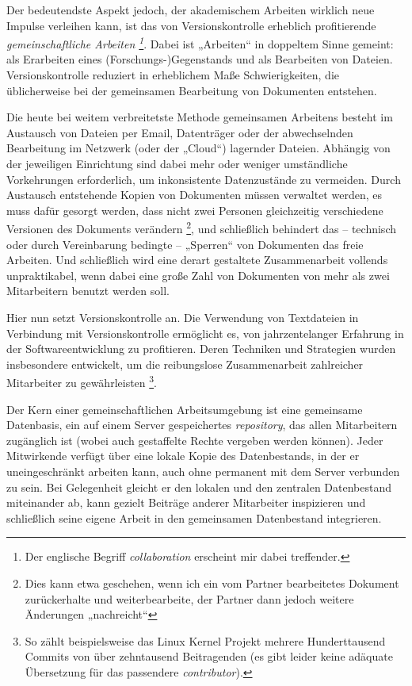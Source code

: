\documentclass[DIV=12]{scrreprt}
\begin{document}
Der bedeutendste Aspekt jedoch, der akademischem Arbeiten wirklich neue Impulse verleihen kann, ist das von Versionskontrolle erheblich profitierende \emph{gemeinschaftliche Arbeiten%
\footnote{Der englische Begriff \emph{collaboration} erscheint mir dabei treffender.}}.
Dabei ist „Arbeiten“ in doppeltem Sinne gemeint: als Erarbeiten eines (Forschungs-)Gegenstands und als Bearbeiten von Dateien.
Versionskontrolle reduziert in erheblichem Maße Schwierigkeiten, die üblicherweise bei der gemeinsamen Bearbeitung von Dokumenten entstehen.

Die heute bei weitem verbreitetste Methode gemeinsamen Arbeitens besteht im Austausch von Dateien per Email, Datenträger oder der abwechselnden Bearbeitung im Netzwerk (oder der „Cloud“) lagernder Dateien.
Abhängig von der jeweiligen Einrichtung sind dabei mehr oder weniger umständliche Vorkehrungen erforderlich, um inkonsistente Datenzustände zu vermeiden.
Durch Austausch entstehende Kopien von Dokumenten müssen verwaltet werden, es muss dafür gesorgt werden, dass nicht zwei Personen gleichzeitig verschiedene Versionen des Dokuments verändern%
\footnote{Dies kann etwa geschehen, wenn ich ein vom Partner bearbeitetes Dokument zurückerhalte und weiterbearbeite, der Partner dann jedoch weitere Änderungen „nachreicht“},
und schließlich behindert das -- technisch oder durch Vereinbarung bedingte -- „Sperren“ von Dokumenten das freie Arbeiten.
Und schließlich wird eine derart gestaltete Zusammenarbeit vollends unpraktikabel, wenn dabei eine große Zahl von Dokumenten von mehr als zwei Mitarbeitern benutzt werden soll.

Hier nun setzt Versionskontrolle an.
Die Verwendung von Textdateien in Verbindung mit Versionskontrolle ermöglicht es, von jahrzentelanger Erfahrung in der Softwareentwicklung zu profitieren.
Deren Techniken und Strategien wurden insbesondere entwickelt, um die reibungslose Zusammenarbeit zahlreicher Mitarbeiter zu gewährleisten%
\footnote{So zählt beispielsweise das Linux Kernel Projekt mehrere Hunderttausend Commits von über zehntausend Beitragenden (es gibt leider keine adäquate Übersetzung für das passendere \emph{contributor}).}.

Der Kern einer gemeinschaftlichen Arbeitsumgebung ist eine gemeinsame Datenbasis, ein auf einem Server gespeichertes \emph{repository}, das allen Mitarbeitern zugänglich ist (wobei auch gestaffelte Rechte vergeben werden können).
Jeder Mitwirkende verfügt über eine lokale Kopie des Datenbestands, in der er uneingeschränkt arbeiten kann, auch ohne permanent mit dem Server verbunden zu sein.
Bei Gelegenheit gleicht er den lokalen und den zentralen Datenbestand miteinander ab, kann gezielt Beiträge anderer Mitarbeiter inspizieren und schließlich seine eigene Arbeit in den gemeinsamen Datenbestand integrieren.
\end{document}
